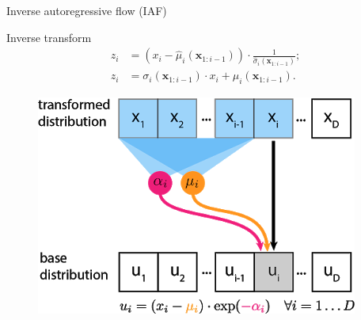 \documentclass{beamer}
\newcommand{\bx}{\mathbf{x}}
\begin{document}
\begin{frame}{Inverse autoregressive flow (IAF)}
	\begin{minipage}[t]{0.65\columnwidth}
		\begin{block}{Inverse transform}
			\vspace{-0.5cm}
			\begin{align*}
				z_i &= (x_i - \hat{\mu}_i(\bx_{1:i-1})) \cdot \frac{1}{\hat{\sigma}_i (\bx_{1:i-1}) }; \\
				z_i &= \sigma_i (\bx_{1:i-1}) \cdot x_i + \mu_i(\bx_{1:i-1}).
			\end{align*}
			\vspace{-0.4cm}
		\end{block}
	\end{minipage}%
	\begin{minipage}[t]{0.35\columnwidth}
		\begin{figure}[h]
			\centering
			\includegraphics[width=.9\linewidth]{figs/maf_iaf_explained_2.png}
		\end{figure}
	\end{minipage}\\
	\vspace{0.1cm}
	

\end{frame}
\end{document}
